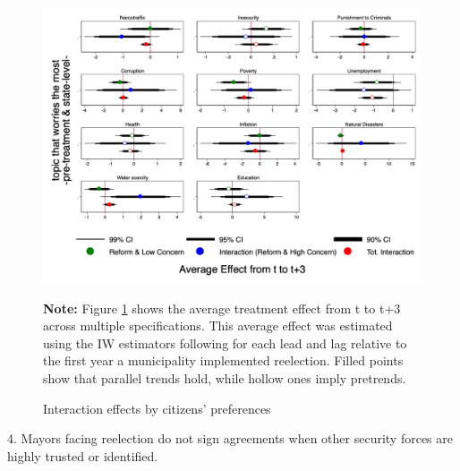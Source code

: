 \documentclass[12pt]{amsart}
\numberwithin{equation}{section}
\theoremstyle{definition}
\theoremstyle{definition}
\theoremstyle{definition}
\begin{document}
\begin{figure}[H]   
\centering
 \caption{Interaction effects by citizens' preferences}
 \label{fig:preferences}
\includegraphics[width=1\textwidth]{../Figures/preferences.png}
       \captionsetup{justification=centering}
       
 \textbf{Note:} Figure \ref{fig:preferences} shows the average treatment effect from t to t+3 across multiple specifications. This average effect was estimated using the IW estimators following \citet{abraham_sun_2020} for each lead and lag relative to the first year a municipality implemented reelection. Filled points show that parallel trends hold, while hollow ones imply pretrends.  
\end{figure} 
  
  \clearpage
4. Mayors facing reelection do not sign agreements when other security forces are highly trusted or identified.
\end{document}
